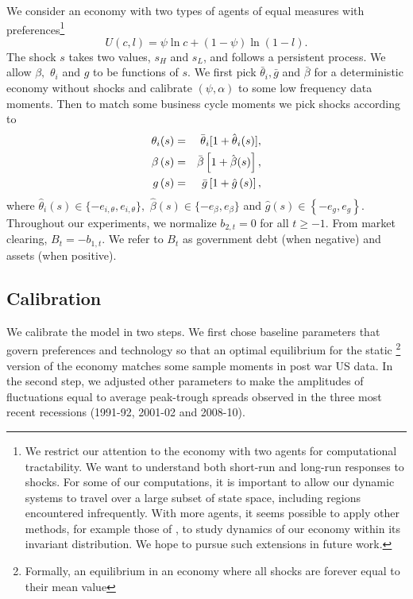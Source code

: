 \documentclass[thmsb,11pt]{article}
\begin{document}
{\smallskip We consider an economy with two types of agents%
of equal measures with preferences\footnote{%
We restrict our attention to the economy with two agents for computational
tractability. We want to understand both short-run and long-run
responses to shocks.  For some of our computations,  it is important to allow our
dynamic systems to travel over a large subset of state space, including regions encountered infrequently.
With more agents, it seems  possible to apply other methods,  for example those of  \cite{Judd2011}, to study dynamics of our economy within its invariant
distribution. We hope to pursue such extensions in  future work.}
\begin{equation*}
U\left( c,l\right) =\psi \ln c+\left( 1-\psi \right) \ln \left( 1-l\right) .
\end{equation*}%
The shock $s$   takes two values, $s_{H}$ and $s_{L}$, and follows a persistent
process. We allow $\beta ,$ $\theta _{i}$ and $g$ to be
functions of $s.$ We first pick $\bar{\theta}_{i},\bar{g}$
and $\bar{\beta}$ for a deterministic economy without shocks and calibrate $%
\left( \psi ,\alpha \right) $ to some low frequency  data moments. Then to match some business cycle moments we
pick shocks  according to
\begin{eqnarray}\label{eqn:newstar}
\theta _{i}(s) &=&\bar{\theta}_{i}[1+{\hat{\theta}}_{i}(s)], \cr
\beta \left( s\right) &=&\bar{\beta}\left[ 1+\hat{\beta}(s)\right] , \cr
g\left( s\right) &=&\bar{g}\left[ 1+\hat{g}\left( s\right) \right] ,
\end{eqnarray}%
where $\hat{\theta}_{i}\left( s\right) \in \{-e_{i,\theta },e_{i,\theta }\},$
$\hat{\beta}\left( s\right) \in \{-e_{\beta },e_{\beta }\}$ and $\hat{g}%
\left( s\right) \in \left\{ -e_{g},e_{g}\right\} .$ Throughout  our
experiments, we normalize $b_{2,t}=0$ for all $t\geq -1$. From market
clearing,  $B_{t}=-b_{1,t}$.  We refer to $B_{t}$ as
government debt (when negative) and  assets (when positive).

\smallskip

\subsection{\protect\smallskip Calibration}

\smallskip We calibrate the model in two steps. We first chose baseline parameters
that govern preferences and technology so  that an optimal equilibrium for the static%
\footnote{%
Formally, an equilibrium in an economy where all shocks are forever equal to their
mean value} version of the economy matches some sample moments in post war US data.  In the second step, we adjusted other parameters  to make the amplitudes of
fluctuations equal to average peak-trough spreads observed in
the  three most recent recessions (1991-92, 2001-02 and 2008-10).

}
\end{document}
